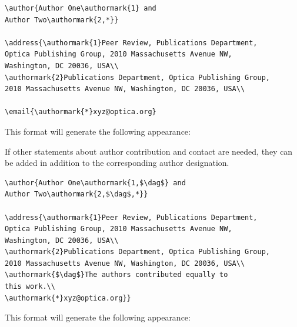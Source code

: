 \documentclass{optica-article}
\begin{document}
\begin{verbatim}
\author{Author One\authormark{1} and 
Author Two\authormark{2,*}}

\address{\authormark{1}Peer Review, Publications Department,
Optica Publishing Group, 2010 Massachusetts Avenue NW,
Washington, DC 20036, USA\\
\authormark{2}Publications Department, Optica Publishing Group,
2010 Massachusetts Avenue NW, Washington, DC 20036, USA\\

\email{\authormark{*}xyz@optica.org}
\end{verbatim}

This format will generate the following appearance:  

\bigskip

\author{Author One and Author Two}

\address{Peer Review, Publications Department,
Optica Publishing Group, 2010 Massachusetts Avenue NW,
Washington, DC 20036, USA\\
Publications Department, Optica Publishing Group,
2010 Massachusetts Avenue NW, Washington, DC 20036, USA\\

}

\medskip

If other statements about author contribution and contact are needed, they can be added in addition to the corresponding author designation.
\begin{verbatim}
\author{Author One\authormark{1,$\dag$} and 
Author Two\authormark{2,$\dag$,*}}

\address{\authormark{1}Peer Review, Publications Department,
Optica Publishing Group, 2010 Massachusetts Avenue NW,
Washington, DC 20036, USA\\
\authormark{2}Publications Department, Optica Publishing Group,
2010 Massachusetts Avenue NW, Washington, DC 20036, USA\\
\authormark{$\dag$}The authors contributed equally to
this work.\\
\authormark{*}xyz@optica.org}}
\end{verbatim}

This format will generate the following appearance:

\medskip

\author{Author One and Author Two}
\end{document}
